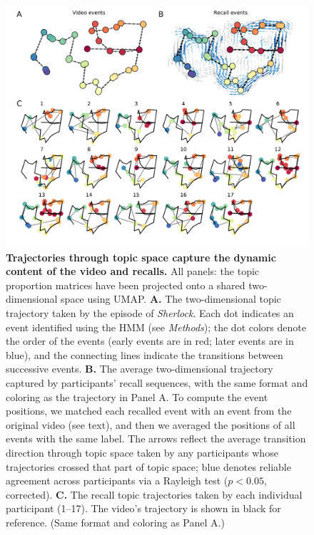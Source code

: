 \documentclass{article}
\begin{document}
\begin{figure}[tp]
\centering
\includegraphics[width=1\textwidth]{figs/trajectory}
\caption{\small \textbf{Trajectories through topic space capture the dynamic content of the video and recalls.}  All panels: the topic proportion matrices have been projected onto a shared two-dimensional space using UMAP.  \textbf{A.} The two-dimensional topic trajectory taken by the episode of \textit{Sherlock}.  Each dot indicates an event identified using the HMM (see \textit{Methods}); the dot colors denote the order of the events (early events are in red; later events are in blue), and the connecting lines indicate the transitions between successive events.  \textbf{B.} The average two-dimensional trajectory captured by participants' recall sequences, with the same format and coloring as the trajectory in Panel A.  To compute the event positions, we matched each recalled event with an event from the original video (see text), and then we averaged the positions of all events with the same label.  The arrows reflect the average transition direction through topic space taken by any participants whose trajectories crossed that part of topic space; blue denotes reliable agreement across participants via a Rayleigh test ($p < 0.05$, corrected).  \textbf{C.} The recall topic trajectories taken by each individual participant (1--17).  The video's trajectory is shown in black for reference.  (Same format and coloring as Panel A.)}
\label{fig:trajectory}
\end{figure}
\end{document}
